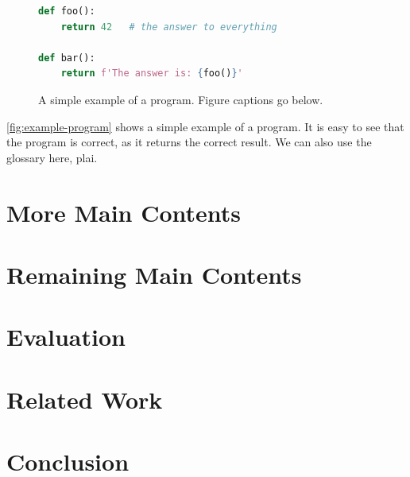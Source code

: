 \documentclass[thesis]{plai}
\begin{document}
\begin{figure}[t]
\begin{lstlisting}[language=Python]
def foo():
    return 42   # the answer to everything

def bar():
    return f'The answer is: {foo()}'
\end{lstlisting}
\caption{A simple example of a program. Figure captions go below.}
\label{fig:example-program}
\end{figure}

\autoref{fig:example-program} shows a simple example of a program.
It is easy to see that the program is correct, as it returns the correct result.
We can also use the glossary here, \gls{plai}.

\chapter{More Main Contents}
\label{sec:transfer}

\lipsum[2-3]


\chapter{Remaining Main Contents}
\label{sec:remaining}

\lipsum[2-3]

\chapter{Evaluation}
\label{sec:evaluation}



\chapter{Related Work}
\label{sec:related-work}



\chapter{Conclusion}
\label{sec:conclusion}






\pagebreak



\pagebreak

\listoffigures{}
\listoftables{}

\pagebreak

\printglossaries
\end{document}
